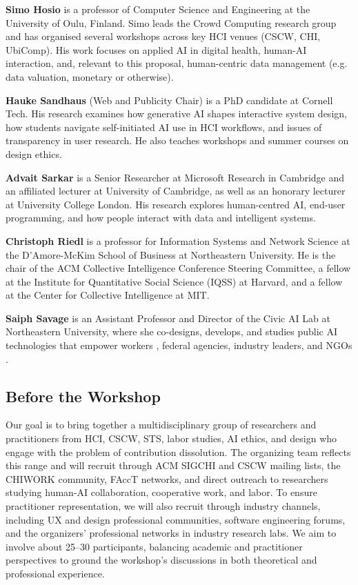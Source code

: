 \documentclass[manuscript,review]{acmart}
\begin{document}
\textbf{Simo Hosio} is a professor of Computer Science and Engineering at the University of Oulu, Finland. Simo leads the Crowd Computing research group and has organised several workshops across key HCI venues (CSCW, CHI, UbiComp). His work focuses on applied AI in digital health, human-AI interaction, and, relevant to this proposal, human-centric data management (e.g. data valuation, monetary or otherwise).  

\textbf{Hauke Sandhaus} (Web and Publicity Chair) is a PhD candidate at Cornell Tech. His research examines how generative AI shapes interactive system design, how students navigate self-initiated AI use in HCI workflows, and issues of transparency in user research. He also teaches workshops and summer courses on design ethics.

\textbf{Advait Sarkar} is a Senior Researcher at Microsoft Research in Cambridge and an affiliated lecturer at University of Cambridge, as well as an honorary lecturer at University College London. His research explores human-centred AI, end-user programming, and how people interact with data and intelligent systems.

\textbf{Christoph Riedl} is a professor for Information Systems and Network Science at the D’Amore-McKim School of Business at Northeastern University. He is the chair of the ACM Collective Intelligence Conference Steering Committee, a fellow at the Institute for Quantitative Social Science (IQSS) at Harvard, and a fellow at the Center for Collective Intelligence at MIT. 


\textbf{Saiph Savage} is an Assistant Professor and Director of the Civic AI Lab at Northeastern University, where she co-designs, develops, and studies public AI technologies that empower workers \cite{savagegigsense, savage2026ai}, federal agencies, industry leaders, and NGOs \cite{saiph2024human}.




\subsection{Before the Workshop}
Our goal is to bring together a multidisciplinary group of researchers and practitioners from HCI, CSCW, STS, labor studies, AI ethics, and design who engage with the problem of contribution dissolution. The organizing team reflects this range and will recruit through ACM SIGCHI and CSCW mailing lists, the CHIWORK community, FAccT networks, and direct outreach to researchers studying human-AI collaboration, cooperative work, and labor. To ensure practitioner representation, we will also recruit through industry channels, including UX and design professional communities, software engineering forums, and the organizers' professional networks in industry research labs. We aim to involve about 25–30 participants, balancing academic and practitioner perspectives to ground the workshop's discussions in both theoretical and professional experience.
\end{document}
